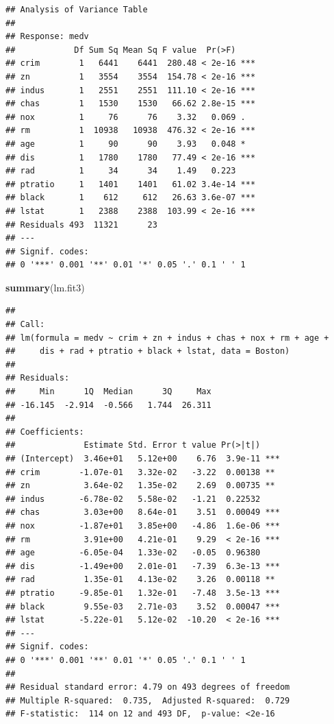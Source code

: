 \documentclass[
]{book}
\newenvironment{Shaded}{\begin{snugshade}}{\end{snugshade}}
\newcommand{\FunctionTok}[1]{\textcolor[rgb]{0.13,0.29,0.53}{\textbf{#1}}}
\newcommand{\NormalTok}[1]{#1}
\theoremstyle{definition}
\theoremstyle{definition}
\theoremstyle{definition}
\theoremstyle{definition}
\theoremstyle{remark}
\begin{document}
\begin{verbatim}
## Analysis of Variance Table
## 
## Response: medv
##            Df Sum Sq Mean Sq F value  Pr(>F)    
## crim        1   6441    6441  280.48 < 2e-16 ***
## zn          1   3554    3554  154.78 < 2e-16 ***
## indus       1   2551    2551  111.10 < 2e-16 ***
## chas        1   1530    1530   66.62 2.8e-15 ***
## nox         1     76      76    3.32   0.069 .  
## rm          1  10938   10938  476.32 < 2e-16 ***
## age         1     90      90    3.93   0.048 *  
## dis         1   1780    1780   77.49 < 2e-16 ***
## rad         1     34      34    1.49   0.223    
## ptratio     1   1401    1401   61.02 3.4e-14 ***
## black       1    612     612   26.63 3.6e-07 ***
## lstat       1   2388    2388  103.99 < 2e-16 ***
## Residuals 493  11321      23                    
## ---
## Signif. codes:  
## 0 '***' 0.001 '**' 0.01 '*' 0.05 '.' 0.1 ' ' 1
\end{verbatim}

\begin{Shaded}
\begin{Highlighting}[]
\FunctionTok{summary}\NormalTok{(lm.fit3)}
\end{Highlighting}
\end{Shaded}

\begin{verbatim}
## 
## Call:
## lm(formula = medv ~ crim + zn + indus + chas + nox + rm + age + 
##     dis + rad + ptratio + black + lstat, data = Boston)
## 
## Residuals:
##     Min      1Q  Median      3Q     Max 
## -16.145  -2.914  -0.566   1.744  26.311 
## 
## Coefficients:
##              Estimate Std. Error t value Pr(>|t|)    
## (Intercept)  3.46e+01   5.12e+00    6.76  3.9e-11 ***
## crim        -1.07e-01   3.32e-02   -3.22  0.00138 ** 
## zn           3.64e-02   1.35e-02    2.69  0.00735 ** 
## indus       -6.78e-02   5.58e-02   -1.21  0.22532    
## chas         3.03e+00   8.64e-01    3.51  0.00049 ***
## nox         -1.87e+01   3.85e+00   -4.86  1.6e-06 ***
## rm           3.91e+00   4.21e-01    9.29  < 2e-16 ***
## age         -6.05e-04   1.33e-02   -0.05  0.96380    
## dis         -1.49e+00   2.01e-01   -7.39  6.3e-13 ***
## rad          1.35e-01   4.13e-02    3.26  0.00118 ** 
## ptratio     -9.85e-01   1.32e-01   -7.48  3.5e-13 ***
## black        9.55e-03   2.71e-03    3.52  0.00047 ***
## lstat       -5.22e-01   5.12e-02  -10.20  < 2e-16 ***
## ---
## Signif. codes:  
## 0 '***' 0.001 '**' 0.01 '*' 0.05 '.' 0.1 ' ' 1
## 
## Residual standard error: 4.79 on 493 degrees of freedom
## Multiple R-squared:  0.735,  Adjusted R-squared:  0.729 
## F-statistic:  114 on 12 and 493 DF,  p-value: <2e-16
\end{verbatim}
\end{document}

